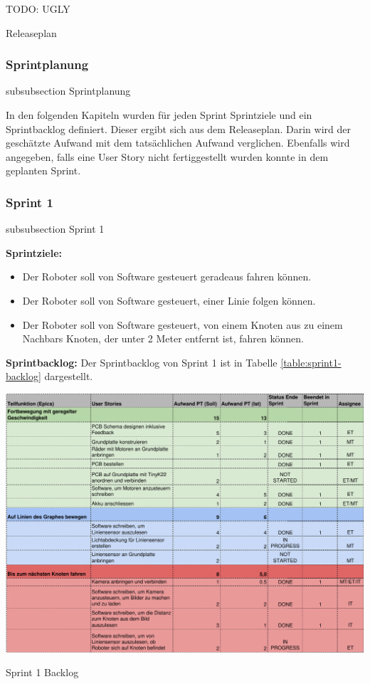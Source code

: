 TODO: UGLY



\begin{table}[H]
\centering
\caption{Releaseplan}
\label{table:release-plan}
\end{table}


\subsubsection*{Sprintplanung}
    {subsubsection}
    {Sprintplanung}

    
In den folgenden Kapiteln wurden für jeden Sprint Sprintziele und ein Sprintbacklog definiert. Dieser ergibt sich aus dem Releaseplan. Darin wird der geschätzte Aufwand mit dem tatsächlichen Aufwand verglichen. Ebenfalls wird angegeben, falls eine User Story nicht fertiggestellt wurden konnte in dem geplanten Sprint.

\subsubsection*{Sprint 1}
    {subsubsection}
    {Sprint 1}

\textbf{Sprintziele:}
\begin{itemize}
    \item Der Roboter soll von Software gesteuert geradeaus fahren können.
    \item Der Roboter soll von Software gesteuert, einer Linie folgen können.
    \item Der Roboter soll von Software gesteuert, von einem Knoten aus zu einem Nachbars Knoten, der unter 2 Meter entfernt ist, fahren können.
\end{itemize}

\textbf{Sprintbacklog:} Der Sprintbacklog von Sprint 1 ist in Tabelle 
\ref{table:sprint1-backlog} 
dargestellt.

\begin{table}[H]
\centering
\includegraphics[width=\textwidth]{assets/projektmanagement/sprint1-crop.pdf}
\caption{Sprint 1 Backlog}
\label{table:sprint1-backlog}
\end{table}

